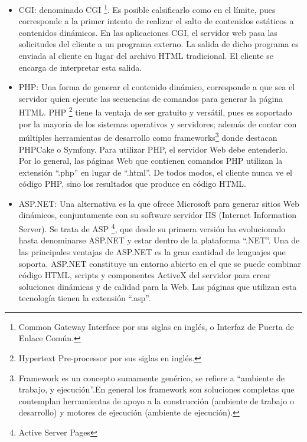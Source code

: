 \begin{itemize}
 \item CGI: denominado CGI \footnote{Common Gateway Interface por sus siglas en inglés, o 
	    Interfaz de Puerta de Enlace Común.}. Es posible calsificarlo como en el límite, pues 
	    corresponde a la primer intento de realizar el salto de contenidos estáticos a contenidos 
	    dinámicos. En las aplicaciones CGI, el servidor web pasa las solicitudes del cliente a un 
	    programa externo.  La salida de dicho programa es enviada al cliente en lugar del archivo 
	    HTML tradicional. El cliente se encarga de interpretar esta salida.
	    
 \item PHP: Una forma de generar el contenido dinámico, corresponde a que sea el servidor quien ejecute 
	    las secuencias de comandos para generar la página HTML. PHP \footnote{Hypertext Pre-processor 
	    por sus siglas en inglés.}  tiene la ventaja de ser gratuito y versátil, pues es soportado por 
	    la mayoría de los sistemas operativos y servidores; además de contar con múltiples herramientas
	    de desarrollo como frameworks\footnote{Framework es un concepto sumamente genérico, se refiere 
	    a “ambiente de trabajo, y ejecución”.En general los framework son soluciones completas que 
	    contemplan herramientas de apoyo a la construcción (ambiente de trabajo o desarrollo) y motores 
	    de ejecución (ambiente de ejecución).} donde destacan PHPCake o Symfony. Para utilizar PHP, el 
	    servidor Web debe entenderlo. Por lo general, las páginas Web que contienen comandos PHP utilizan 
	    la extensión “.php” en lugar de “.html”. De todos modos, el cliente nunca ve el código PHP, sino 
	    los resultados que produce en código HTML.

 \item ASP.NET: Una alternativa es la que ofrece Microsoft para generar sitios Web dinámicos, conjuntamente
		con su software servidor IIS (Internet Information Server). Se trata de ASP \footnote{Active 
		Server Pages}, que desde su primera versión ha evolucionado hasta denominarse ASP.NET y estar 
		dentro de la plataforma “.NET”. Una de las principales ventajas de ASP.NET es la gran cantidad 
		de lenguajes que soporta. ASP.NET constituye un entorno abierto en el que se puede combinar 
		código HTML, scripts y componentes ActiveX del servidor para crear soluciones dinámicas y de 
		calidad para la Web. Las páginas que utilizan esta tecnología tienen la extensión “.asp”.
		
\end{itemize}

